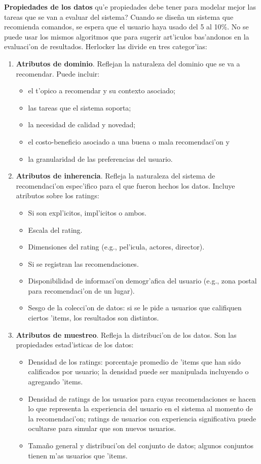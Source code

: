 \documentclass[11pt]{article}
\begin{document}
\bigskip
\noindent
\textbf{Propiedades de los datos}
\textquestiondown qu'e propiedades debe tener para modelar mejor las tareas que se van a evaluar del sistema? Cuando se dise\~{n}a un sistema que recomienda comandos, se espera que el usuario haya usado del 5 al 10\%. No se puede usar los mismos algoritmos que para sugerir art'iculos bas'andonos en la evaluaci'on de resultados. Herlocker las divide en tres categor'ias:
	\begin{enumerate}
	\item \textbf{Atributos de dominio}. Reflejan la naturaleza del dominio que se va a recomendar. Puede incluir:
	\begin{itemize}
	\item el t'opico a recomendar y su contexto asociado;
	\item las tareas que el sistema soporta;
	\item la necesidad de calidad y novedad;
	\item el costo-beneficio asociado a una buena o mala recomendaci'on y
	\item la granularidad de las preferencias del usuario.
	\end{itemize}
	\item \textbf{Atributos de inherencia}. Refleja la naturaleza del sistema de recomendaci'on espec'ifico para el que fueron hechos los datos. Incluye atributos sobre los ratings:
	\begin{itemize}
	\item Si son expl'icitos, impl'icitos o ambos.
	\item Escala del rating.
	\item Dimensiones del rating (e.g., pel'icula, actores, director).
	\item Si se registran las recomendaciones.
	\item Disponibilidad de informaci'on demogr'afica del usuario (e.g., zona postal para recomendaci'on de un lugar).
	\item Sesgo de la colecci'on de datos: si se le pide a usuarios que califiquen ciertos 'items, los resultados son distintos.
	\end{itemize}
	\item \textbf{Atributos de muestreo}. Refleja la distribuci'on de los datos. Son las propiedades estad'isticas de los datos:
	\begin{itemize}
	\item Densidad de los ratings: porcentaje promedio de 'items que han sido calificados por usuario; la densidad puede ser manipulada incluyendo o agregando 'items.
	\item Densidad de ratings de los usuarios para cuyas recomendaciones se hacen lo que representa la experiencia del usuario en el sistema al momento de la recomendaci'on; ratings de usuarios con experiencia significativa puede ocultarse para simular que son nuevos usuarios.
	\item Tama\~{n}o general y distribuci'on del conjunto de datos; algunos conjuntos tienen m'as usuarios que 'items.
	\end{itemize}
	\end{enumerate}
\end{document}
